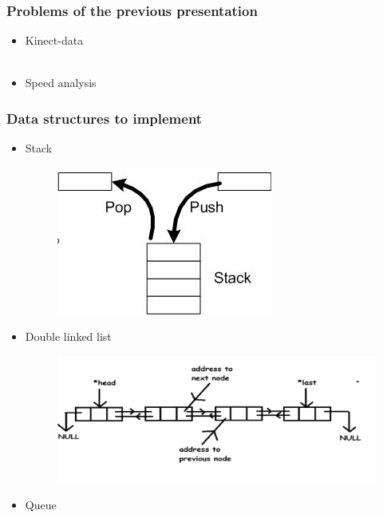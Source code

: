 \documentclass{beamer}
\begin{document}
\begin{frame}
\frametitle{Problems of the previous presentation}
\begin{itemize}
\item Kinect-data\\~\\
\item Speed analysis
\end{itemize}

\end{frame}

\begin{frame}
\frametitle{Data structures to implement}

\begin{itemize}
\item Stack
\begin{figure}
\centering
        \includegraphics[totalheight=1.5cm]{Stack.jpg}
    \label{fig:verticalcell}
    \end{figure}
\item Double linked list
\begin{figure}
\centering
        \includegraphics[totalheight=2cm]{list.png}
    \label{fig:verticalcell}
    \end{figure}
    
\item Queue


\end{itemize}
\end{frame}
\end{document}

